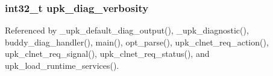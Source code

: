 \subsubsection[{upk\_\-diag\_\-verbosity}]{\setlength{\rightskip}{0pt plus 5cm}int32\_\-t {\bf upk\_\-diag\_\-verbosity}}\label{controller_2tp_8c_ad9883b6b44bf3fa3e1abac4266ca1b65}


Referenced by \_\-upk\_\-default\_\-diag\_\-output(), \_\-upk\_\-diagnostic(), buddy\_\-diag\_\-handler(), main(), opt\_\-parse(), upk\_\-clnet\_\-req\_\-action(), upk\_\-clnet\_\-req\_\-signal(), upk\_\-clnet\_\-req\_\-status(), and upk\_\-load\_\-runtime\_\-services().

